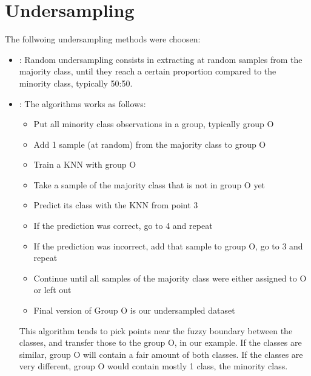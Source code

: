 \documentclass[letterpaper,10pt,english]{jupyterBook}
\begin{document}
\section{Undersampling}
\label{\detokenize{Model_evaluation:undersampling}}
\sphinxAtStartPar
The follwoing undersampling methods were choosen:
\begin{itemize}
\item {} 
\sphinxAtStartPar
{}: Random undersampling consists in extracting at random samples from the majority class, until they reach a certain proportion compared to the minority class, typically 50:50.

\item {} 
\sphinxAtStartPar
{}: The algorithms works as follows:
\begin{itemize}
\item {} 
\sphinxAtStartPar
Put all minority class observations in a group, typically group O

\item {} 
\sphinxAtStartPar
Add 1 sample (at random) from the majority class to group O

\item {} 
\sphinxAtStartPar
Train a KNN with group O

\item {} 
\sphinxAtStartPar
Take a sample of the majority class that is not in group O yet

\item {} 
\sphinxAtStartPar
Predict its class with the KNN from point 3

\item {} 
\sphinxAtStartPar
If the prediction was correct, go to 4 and repeat

\item {} 
\sphinxAtStartPar
If the prediction was incorrect, add that sample to group O, go to 3 and repeat

\item {} 
\sphinxAtStartPar
Continue until all samples of the majority class were either assigned to O or left out

\item {} 
\sphinxAtStartPar
Final version of Group O is our undersampled dataset

\end{itemize}

\sphinxAtStartPar
This algorithm tends to pick points near the fuzzy boundary between the classes, and transfer those to the group O, in our example. If the classes are similar, group O will contain a fair amount of both classes. If the classes are very different, group O would contain mostly 1 class, the minority class.


\end{itemize}
\end{document}
